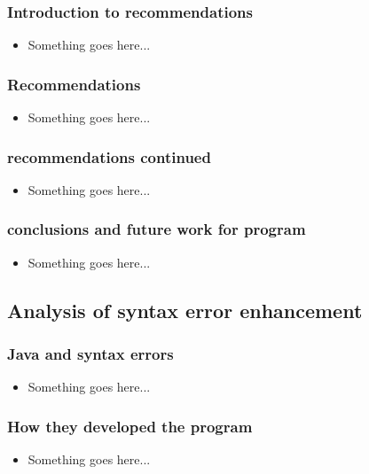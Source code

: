 \documentclass{beamer}
\begin{document}
\begin{frame}
	\frametitle{Introduction to recommendations}
		\begin{itemize}
			\item Something goes here...
		\end{itemize}

\end{frame}

\begin{frame}
	\frametitle{Recommendations}
		\begin{itemize}
			\item Something goes here...
		\end{itemize}

\end{frame}

\begin{frame}
	\frametitle{recommendations continued}
		\begin{itemize}
			\item Something goes here...
		\end{itemize}

\end{frame}

\begin{frame}
	\frametitle{conclusions and future work for program}
		\begin{itemize}
			\item Something goes here...
		\end{itemize}

\end{frame}

\subsection[Syntax error enhancement]{Analysis of syntax error enhancement}

\begin{frame}
	\frametitle{Java and syntax errors}
		\begin{itemize}
			\item Something goes here...
		\end{itemize}

\end{frame}

\begin{frame}
	\frametitle{How they developed the program}
		\begin{itemize}
			\item Something goes here...
		\end{itemize}

\end{frame}
\end{document}
